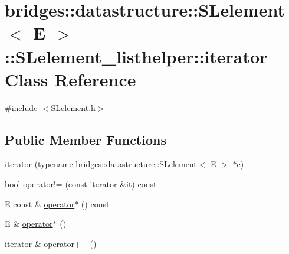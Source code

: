 \hypertarget{classbridges_1_1datastructure_1_1_s_lelement_1_1_s_lelement__listhelper_1_1iterator}{}\section{bridges\+:\+:datastructure\+:\+:S\+Lelement$<$ E $>$\+:\+:S\+Lelement\+\_\+listhelper\+:\+:iterator Class Reference}
\label{classbridges_1_1datastructure_1_1_s_lelement_1_1_s_lelement__listhelper_1_1iterator}


{\ttfamily \#include $<$S\+Lelement.\+h$>$}

\subsection*{Public Member Functions}
\begin{DoxyCompactItemize}
\item 
\mbox{\hyperlink{classbridges_1_1datastructure_1_1_s_lelement_1_1_s_lelement__listhelper_1_1iterator_a1144192d651fcb5b12eb8cb33dc8d554}{iterator}} (typename \mbox{\hyperlink{classbridges_1_1datastructure_1_1_s_lelement}{bridges\+::datastructure\+::\+S\+Lelement}}$<$ E $>$ $\ast$c)
\item 
bool \mbox{\hyperlink{classbridges_1_1datastructure_1_1_s_lelement_1_1_s_lelement__listhelper_1_1iterator_a2bfd8ffd134a55488f27d1263d3c95a4}{operator!=}} (const \mbox{\hyperlink{classbridges_1_1datastructure_1_1_s_lelement_1_1_s_lelement__listhelper_1_1iterator}{iterator}} \&it) const
\item 
E const  \& \mbox{\hyperlink{classbridges_1_1datastructure_1_1_s_lelement_1_1_s_lelement__listhelper_1_1iterator_a2212bbad66903bdc0051ebeb21119ea2}{operator$\ast$}} () const
\item 
E \& \mbox{\hyperlink{classbridges_1_1datastructure_1_1_s_lelement_1_1_s_lelement__listhelper_1_1iterator_af38cfaf00efb8cc5e7ba0d2328e9e081}{operator$\ast$}} ()
\item 
\mbox{\hyperlink{classbridges_1_1datastructure_1_1_s_lelement_1_1_s_lelement__listhelper_1_1iterator}{iterator}} \& \mbox{\hyperlink{classbridges_1_1datastructure_1_1_s_lelement_1_1_s_lelement__listhelper_1_1iterator_ab5847041e6e49fa6bcfd5efe6d2a1e1a}{operator++}} ()
\end{DoxyCompactItemize}



